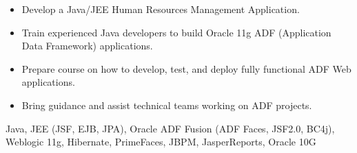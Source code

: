 \begin{experiences}
{                      \begin{itemize}
                        \item Develop a Java/JEE Human Resources Management Application.
                        \item Train experienced Java developers to build Oracle 11g ADF (Application Data Framework) applications.
                        \item Prepare course on how to develop, test, and deploy fully functional ADF Web applications.
                        \item Bring guidance and assist technical teams working on ADF projects.
                      \end{itemize}
                    }
                    {Java, JEE (JSF, EJB, JPA), Oracle ADF Fusion (ADF Faces, JSF2.0, BC4j), Weblogic 11g, Hibernate, PrimeFaces, JBPM, JasperReports, Oracle 10G}
  \emptySeparator
\end{experiences}
